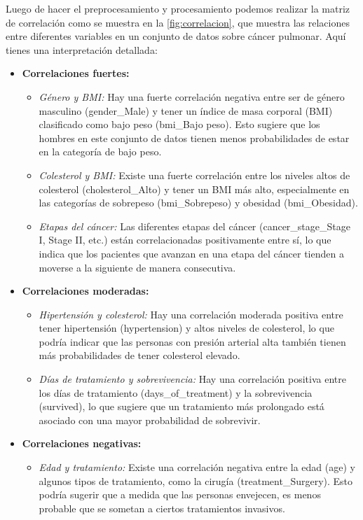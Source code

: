 \documentclass[10pt,journal,compsoc]{IEEEtran}
\begin{document}
Luego de hacer el preprocesamiento y procesamiento podemos realizar la matriz de  correlación como se muestra en la \autoref{fig:correlacion}, que muestra las relaciones entre diferentes variables en un conjunto de datos sobre cáncer pulmonar. Aquí tienes una interpretación detallada:
\begin{itemize}
  \item \textbf{Correlaciones fuertes:}
  \begin{itemize}
    \item \emph{Género y BMI:} Hay una fuerte correlación negativa entre ser de género masculino (gender\_Male) y tener un índice de masa corporal (BMI) clasificado como bajo peso (bmi\_Bajo peso). Esto sugiere que los hombres en este conjunto de datos tienen menos probabilidades de estar en la categoría de bajo peso.
    \item \emph{Colesterol y BMI:} Existe una fuerte correlación entre los niveles altos de colesterol (cholesterol\_Alto) y tener un BMI más alto, especialmente en las categorías de sobrepeso (bmi\_Sobrepeso) y obesidad (bmi\_Obesidad).
    \item \emph{Etapas del cáncer: }Las diferentes etapas del cáncer (cancer\_stage\_Stage I, Stage II, etc.) están correlacionadas positivamente entre sí, lo que indica que los pacientes que avanzan en una etapa del cáncer tienden a moverse a la siguiente de manera consecutiva.
  \end{itemize}
  \item \textbf{Correlaciones moderadas:}
  \begin{itemize}
    \item \emph{Hipertensión y colesterol:} Hay una correlación moderada positiva entre tener hipertensión (hypertension) y altos niveles de colesterol, lo que podría indicar que las personas con presión arterial alta también tienen más probabilidades de tener colesterol elevado.
    \item \emph{Días de tratamiento y sobrevivencia:} Hay una correlación positiva entre los días de tratamiento (days\_of\_treatment) y la sobrevivencia (survived), lo que sugiere que un tratamiento más prolongado está asociado con una mayor probabilidad de sobrevivir.
  \end{itemize}
  \item \textbf{Correlaciones negativas:}
  \begin{itemize}
    \item \emph{Edad y tratamiento:} Existe una correlación negativa entre la edad (age) y algunos tipos de tratamiento, como la cirugía (treatment\_Surgery). Esto podría sugerir que a medida que las personas envejecen, es menos probable que se sometan a ciertos tratamientos invasivos.

\end{itemize}
\end{itemize}
\end{document}
